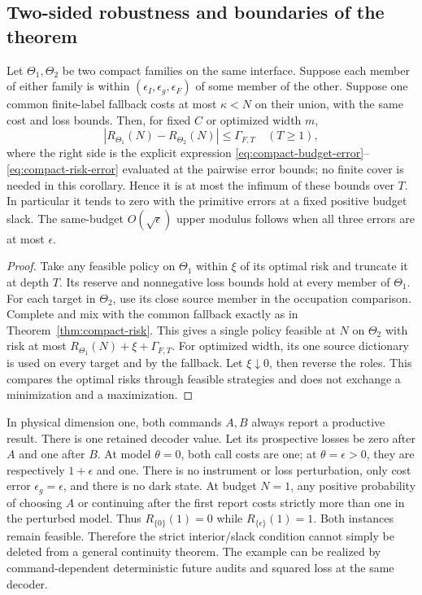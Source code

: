 \subsection{Two-sided robustness and boundaries of the theorem}
\begin{corollary}\label{cor:optimal-robustness}
Let $\Theta_1,\Theta_2$ be two compact families on the same interface. Suppose each member of either family is within $(\epsilon_I,\epsilon_g,\epsilon_F)$ of some member of the other. Suppose one common finite-label fallback costs at most $\kappa<N$ on their union, with the same cost and loss bounds. Then, for fixed $C$ or optimized width $m$,
\[
 |R_{\Theta_1}(N)-R_{\Theta_2}(N)|\le\Gamma_{F,T}
       \quad(T\ge1),
\]
where the right side is the explicit expression \eqref{eq:compact-budget-error}--\eqref{eq:compact-risk-error} evaluated at the pairwise error bounds; no finite cover is needed in this corollary. Hence it is at most the infimum of these bounds over $T$. In particular it tends to zero with the primitive errors at a fixed positive budget slack. The same-budget $O(\sqrt\epsilon)$ upper modulus follows when all three errors are at most $\epsilon$.
\end{corollary}
\begin{proof}
Take any feasible policy on $\Theta_1$ within $\xi$ of its optimal risk and truncate it at depth $T$. Its reserve and nonnegative loss bounds hold at every member of $\Theta_1$. For each target in $\Theta_2$, use its close source member in the occupation comparison. Complete and mix with the common fallback exactly as in Theorem~\ref{thm:compact-risk}. This gives a single policy feasible at $N$ on $\Theta_2$ with risk at most $R_{\Theta_1}(N)+\xi+\Gamma_{F,T}$. For optimized width, its one source dictionary is used on every target and by the fallback. Let $\xi\downarrow0$, then reverse the roles. This compares the optimal risks through feasible strategies and does not exchange a minimization and a maximization.
\end{proof}

\begin{example}\label{ex:boundary-discontinuity}
In physical dimension one, both commands $A,B$ always report a productive result. There is one retained decoder value. Let its prospective losses be zero after $A$ and one after $B$. At model $\theta=0$, both call costs are one; at $\theta=\epsilon>0$, they are respectively $1+\epsilon$ and one. There is no instrument or loss perturbation, only cost error $\epsilon_g=\epsilon$, and there is no dark state. At budget $N=1$, any positive probability of choosing $A$ or continuing after the first report costs strictly more than one in the perturbed model. Thus $R_{\{0\}}(1)=0$ while $R_{\{\epsilon\}}(1)=1$. Both instances remain feasible. Therefore the strict interior/slack condition cannot simply be deleted from a general continuity theorem. The example can be realized by command-dependent deterministic future audits and squared loss at the same decoder.
\end{example}

